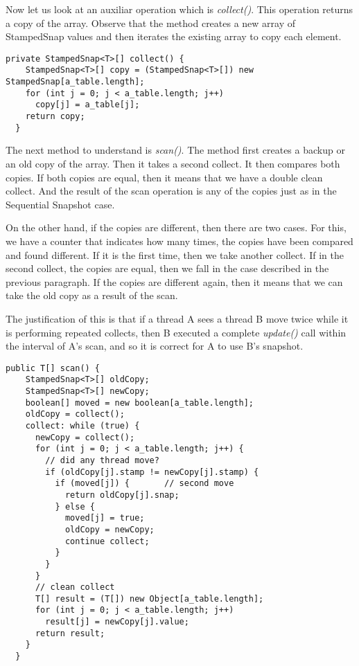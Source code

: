 \par
Now let us look at an auxiliar operation which is \textit{collect()}. This
operation returns a copy of the array. Observe that the method creates a new
array of StampedSnap values and then iterates the existing array to copy each element.
\par
\hfill
\begin{lstlisting}[style=numbers]
  private StampedSnap<T>[] collect() {
    StampedSnap<T>[] copy = (StampedSnap<T>[]) new StampedSnap[a_table.length];
    for (int j = 0; j < a_table.length; j++)
      copy[j] = a_table[j];
    return copy;
  }
\end{lstlisting}
\hfill
\par
The next method to understand is \textit{scan()}. The method first creates a
backup or an old copy of the array. Then it takes a second collect. It then
compares both copies. If both copies are equal, then it means that we have a
double clean collect. And the result of the scan operation is any of the copies
just as in the Sequential Snapshot case.
\par
On the other hand, if the copies are different, then there are two cases. For
this, we have a counter that indicates how many times, the copies have been
compared and found different. If it is the first time, then we take another
collect. If in the second collect, the copies are equal, then we fall in the
case described in the previous paragraph. If the copies are different again,
then it means that we can take the old copy as a result of the scan. 
\par
The justification of this is that if a thread A sees a thread B move twice while
it is performing repeated collects, then B executed a complete \textit{update()}
call within the interval of A's scan, and so it is correct for A to use B's
snapshot.
\par
\hfill
\begin{lstlisting}[style=numbers]
  public T[] scan() {
    StampedSnap<T>[] oldCopy;
    StampedSnap<T>[] newCopy;
    boolean[] moved = new boolean[a_table.length];
    oldCopy = collect();
    collect: while (true) {
      newCopy = collect();
      for (int j = 0; j < a_table.length; j++) {
        // did any thread move?
        if (oldCopy[j].stamp != newCopy[j].stamp) {
          if (moved[j]) {       // second move
            return oldCopy[j].snap;
          } else {
            moved[j] = true;
            oldCopy = newCopy;
            continue collect;
          }   
        }   
      }   
      // clean collect
      T[] result = (T[]) new Object[a_table.length];
      for (int j = 0; j < a_table.length; j++)
        result[j] = newCopy[j].value;
      return result;
    }   
  }
\end{lstlisting}
